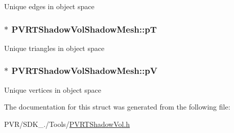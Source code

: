 Unique edges in object space \hypertarget{struct_p_v_r_t_shadow_vol_shadow_mesh_a57f94bc313dba2fa260edffa83c9f4f9}{
\subsubsection[{p\+T}]{$\ast$ P\+V\+R\+T\+Shadow\+Vol\+Shadow\+Mesh\+::p\+T}}\label{struct_p_v_r_t_shadow_vol_shadow_mesh_a57f94bc313dba2fa260edffa83c9f4f9}
Unique triangles in object space \hypertarget{struct_p_v_r_t_shadow_vol_shadow_mesh_a3fc4b970254d1a29eff50bd80f30f2b0}{
\subsubsection[{p\+V}]{$\ast$ P\+V\+R\+T\+Shadow\+Vol\+Shadow\+Mesh\+::p\+V}}\label{struct_p_v_r_t_shadow_vol_shadow_mesh_a3fc4b970254d1a29eff50bd80f30f2b0}
Unique vertices in object space 

The documentation for this struct was generated from the following file\+:\begin{DoxyCompactItemize}
\item 
P\+V\+R/\+S\+D\+K\+\_./\+Tools/\hyperlink{_p_v_r_t_shadow_vol_8h}{P\+V\+R\+T\+Shadow\+Vol.\+h}\end{DoxyCompactItemize}
